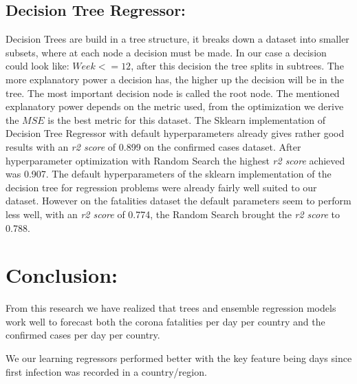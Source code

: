 \documentclass{article}
\begin{document}
\subsection{Decision Tree Regressor:}
Decision Trees are build in a tree structure, it breaks down a dataset into smaller subsets, where at each node a decision must be made. In our case a decision could look like: $Week <= 12$, after this decision the tree splits in subtrees. The more explanatory power a decision has, the higher up the decision will be in the tree. The most important decision node is called the root node. The mentioned explanatory power depends on the metric used, from the optimization we derive the $MSE$ is the best metric for this dataset. 
The Sklearn implementation of Decision Tree Regressor with default hyperparameters already gives rather good results with an \emph{r2 score} of 0.899 on the confirmed cases dataset. After hyperparameter optimization with Random Search the highest \emph{r2 score} achieved was 0.907. The default hyperparameters of the sklearn implementation of the decision tree for regression problems were already fairly well suited to our dataset. However on the fatalities dataset the default parameters seem to perform less well, with an \emph{r2 score} of 0.774, the Random Search brought the \emph{r2 score} to 0.788.




\section{Conclusion:}
From this research we have realized that  trees and ensemble regression models work well to forecast both the corona fatalities per day per country and the confirmed cases per day per country. 

We our learning regressors performed better with the key feature being days since first infection was recorded in a country/region. 
\end{document}
